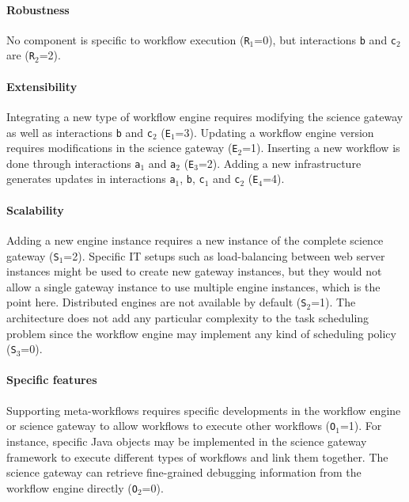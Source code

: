 \documentclass[preprint,3p,twocolumn]{elsarticle}
\begin{document}
\paragraph{Robustness} No component is specific to workflow execution
(\texttt{R$_1$}=0), but interactions \texttt{b} and \texttt{c$_2$} are
(\texttt{R$_2$}=2).

\paragraph{Extensibility} Integrating a new type of workflow engine
requires modifying the science gateway as well as interactions
\texttt{b} and \texttt{c$_2$} (\texttt{E$_1$}=3). Updating a workflow
engine version requires modifications in the science gateway
(\texttt{E$_2$}=1).  Inserting a new workflow is done through
interactions \texttt{a$_1$} and \texttt{a$_2$}
(\texttt{E$_3$}=2). Adding a new infrastructure generates updates in
interactions \texttt{a$_1$}, \texttt{b}, \texttt{c$_1$} and
\texttt{c$_2$} (\texttt{E$_4$}=4).

\paragraph{Scalability} Adding a new engine instance requires a new
instance of the complete science gateway
(\texttt{S$_1$}=2). 
Specific IT setups such as load-balancing between
web server instances might be used to create new gateway instances, but they would not allow a single gateway instance to use multiple engine instances, which is the point here.
Distributed engines are not available by default
(\texttt{S$_2$}=1). 
The architecture does not add any particular complexity to the task scheduling problem since the workflow engine
may implement any kind of scheduling policy (\texttt{S$_3$}=0).

\paragraph{Specific features} Supporting meta-workflows requires
specific developments in the workflow engine or science gateway to
allow workflows to execute other workflows (\texttt{O$_1$}=1). For
instance, specific Java objects may be implemented in the science
gateway framework to execute different types of workflows and link
them together.  The science gateway can
retrieve fine-grained debugging information from the workflow engine
directly (\texttt{O$_2$}=0).
\end{document}
